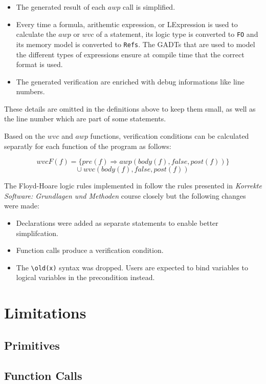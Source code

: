 \documentclass[12pt]{article}
\begin{document}
\begin{itemize}
    \item The generated result of each $awp$ call is simplified.
    \item Every time a formula, arithemtic expression, or LExpression is used to calculate the $awp$ or $wvc$ of a statement, its logic type is converted to \texttt{FO} and its memory model is converted to \texttt{Refs}.
    The GADTs that are used to model the different types of expressions ensure at compile time that the correct format is used.
    \item The generated verification are enriched with debug informations like line numbers.
\end{itemize}

These details are omitted in the definitions above to keep them small, as well as the line number which are part of some statements.

Based on the $wvc$ and $awp$ functions, verification conditions can be calculated separatly for each function of the program as follows:

\[wvcF(f) = \{pre(f)\Rightarrow awp(body(f), false, post(f))\} \]
\[\cup\ wvc(body(f), false, post(f))\]

The Floyd-Hoare logic rules implemented in \verifyc follow the rules presented in 
\emph{Korrekte Software: Grundlagen und Methoden} course closely but the following changes were made:

\begin{itemize}
    \item Declarations were added as separate statements to enable better simplifcation.
    \item Function calls produce a verification condition.
    \item The \texttt{\textbackslash old(x)} syntax was dropped. Users are expected to bind variables to logical variables in the precondition instead.
\end{itemize}


\section{Limitations}

\subsection{Primitives}
\label{primitives}

\subsection{Function Calls}
\label{funcalls}
\end{document}
